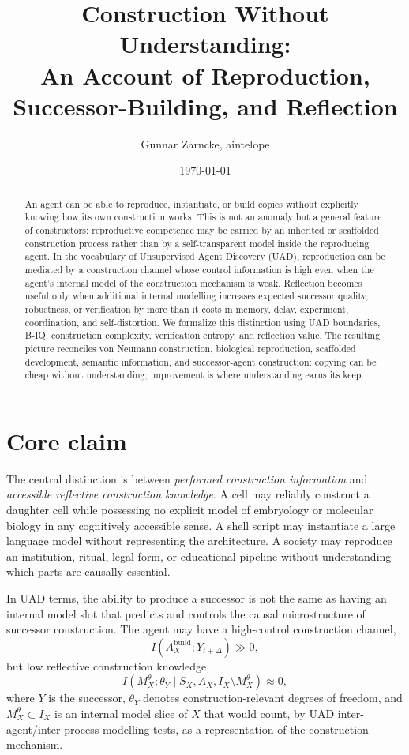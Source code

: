 \documentclass[11pt]{article}
\title{Construction Without Understanding:\\An Account of Reproduction, Successor-Building, and Reflection}
\author{Gunnar Zarncke, aintelope}
\date{\today}
\newcommand{\MI}{I}
\begin{document}
\maketitle

\begin{abstract}
An agent can be able to reproduce, instantiate, or build copies without explicitly knowing how its own construction works. This is not an anomaly but a general feature of constructors: reproductive competence may be carried by an inherited or scaffolded construction process rather than by a self-transparent model inside the reproducing agent. In the vocabulary of Unsupervised Agent Discovery (UAD), reproduction can be mediated by a construction channel whose control information is high even when the agent's internal model of the construction mechanism is weak. Reflection becomes useful only when additional internal modelling increases expected successor quality, robustness, or verification by more than it costs in memory, delay, experiment, coordination, and self-distortion. We formalize this distinction using UAD boundaries, B-IQ, construction complexity, verification entropy, and reflection value. The resulting picture reconciles von Neumann construction, biological reproduction, scaffolded development, semantic information, and successor-agent construction: copying can be cheap without understanding; improvement is where understanding earns its keep.
\end{abstract}

\section{Core claim}

The central distinction is between \emph{performed construction information} and \emph{accessible reflective construction knowledge}. A cell may reliably construct a daughter cell while possessing no explicit model of embryology or molecular biology in any cognitively accessible sense. A shell script may instantiate a large language model without representing the architecture. A society may reproduce an institution, ritual, legal form, or educational pipeline without understanding which parts are causally essential.

In UAD terms, the ability to produce a successor is not the same as having an internal model slot that predicts and controls the causal microstructure of successor construction. The agent may have a high-control construction channel,
\begin{equation}
  \MI(A_X^{\mathrm{build}}; Y_{t+\Delta}) \gg 0,
\end{equation}
but low reflective construction knowledge,
\begin{equation}
  \MI(M_X^{\theta}; \theta_Y \mid S_X,A_X,I_X\setminus M_X^{\theta}) \approx 0,
\end{equation}
where $Y$ is the successor, $\theta_Y$ denotes construction-relevant degrees of freedom, and $M_X^{\theta}\subset I_X$ is an internal model slice of $X$ that would count, by UAD inter-agent/inter-process modelling tests, as a representation of the construction mechanism.
\end{document}
